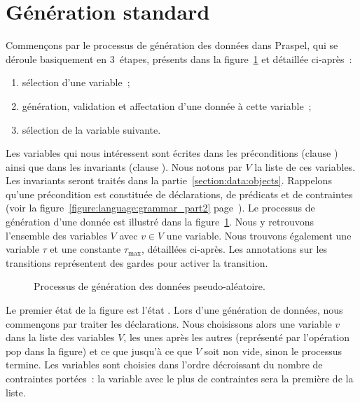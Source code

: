 \section{Génération standard}
\label{section:data:random}

Commençons par le processus de génération des données dans Praspel, qui se
déroule basiquement en 3~étapes, présents dans la
figure~\ref{figure:data:process} et détaillée ci-après~:

\begin{enumerate}

\item sélection d'une variable~;

\item génération, validation et affectation d'une donnée à cette variable~;

\item sélection de la variable suivante.

\end{enumerate}

Les variables qui nous intéressent sont écrites dans les préconditions (clause
\arequires) ainsi que dans les invariants (clause \ainvariant). Nous notons par
$V$ la liste de ces variables. Les invariants seront traités dans la
partie~\ref{section:data:objects}. Rappelons qu'une précondition est constituée
de déclarations, de prédicats et de contraintes (voir la
figure~\ref{figure:language:grammar_part2}
page~\pageref{figure:language:grammar_part2}). Le processus de génération d'une
donnée est illustré dans la figure~\ref{figure:data:process}. Nous y retrouvons
l'ensemble des variables $V$ avec $v \in V$ une variable. Nous trouvons
également une variable $\tau$ et une constante $\tau_\mathrm{max}$, détaillées
ci-après. Les annotations sur les transitions représentent des gardes pour
activer la transition.
%
\begin{figure}


\caption{\label{figure:data:process} Processus de génération des données
pseudo-aléatoire.}

\end{figure}

Le premier état de la figure est l'état . Lors d'une génération de
données, nous commençons par traiter les déclarations. Nous choisissons alors
une variable $v$ dans la liste des variables $V$, les unes après les autres
(représenté par l'opération $\mathrm{pop}$ dans la figure) et ce que jusqu'à ce
que $V$ soit non vide, sinon le processus termine. Les variables sont choisies
dans l'ordre décroissant du nombre de contraintes portées~: la variable avec le
plus de contraintes sera la première de la liste.

